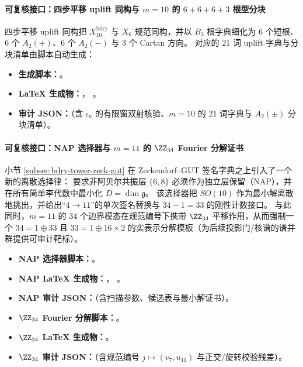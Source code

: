\paragraph{可复核接口：四步平移 uplift 同构与 \texorpdfstring{$m=10$}{m=10} 的 \(6+6+6+3\) 根型分块}
四步平移 uplift 同构把 \(X_{10}^{\mathrm{bdry}}\) 与 \(X_6\) 规范同构，并以 \(B_3\) 根字典细化为
\(6\) 个短根、\(6\) 个 \(A_2(+)\)、\(6\) 个 \(A_2(-)\) 与 \(3\) 个 Cartan 方向。
对应的 \(21\) 词 uplift 字典与分块清单由脚本自动生成：
\begin{itemize}
  \item \textbf{生成脚本：}\texttt{}。
  \item \textbf{LaTeX 生成物：}\texttt{}，
  \texttt{}。
  \item \textbf{审计 JSON：}\texttt{}（含 \(\iota_n\) 的有限窗双射核验、\(m=10\) 的 21 词字典与 \(A_2(\pm)\) 分块清单）。
\end{itemize}

\paragraph{可复核接口：NAP 选择器与 \texorpdfstring{$m=11$}{m=11} 的 \texorpdfstring{$\ZZ_{34}$}{Z34} Fourier 分解证书}
小节 \ref{subsec:bdry-tower-zeck-gut} 在 Zeckendorf--GUT 签名字典之上引入了一个新的离散选择律：
要求非阿贝尔共振层 \(\{6,8\}\) 必须作为独立层保留（NAP），并在所有简单李代数中最小化 \(D=\dim\mathfrak g\)。
该选择器把 \(SO(10)\) 作为最小解离散地挑出，并给出“\(4\to 11\)”的单次签名替换与 \(34-1=33\) 的刚性计数接口。
与此同时，\(m=11\) 的 \(34\) 个边界模态在规范编号下携带 \(\ZZ_{34}\) 平移作用，从而强制一个
\(34=1\oplus 33\) 且 \(33=1\oplus 16\times 2\) 的实表示分解模板（为后续投影门/核谱的谱并群提供可审计靶标）。
\begin{itemize}
  \item \textbf{NAP 选择器脚本：}\texttt{}。
  \item \textbf{NAP LaTeX 生成物：}\texttt{}，
  \texttt{}。
  \item \textbf{NAP 审计 JSON：}\texttt{}（含扫描参数、候选表与最小解证书）。
  \item \textbf{\(\ZZ_{34}\) Fourier 分解脚本：}\texttt{}。
  \item \textbf{\(\ZZ_{34}\) LaTeX 生成物：}\texttt{}。
  \item \textbf{\(\ZZ_{34}\) 审计 JSON：}\texttt{}（含规范编号 \(j\mapsto (v_7,u_{11})\) 与正交/旋转校验残差）。
\end{itemize}


